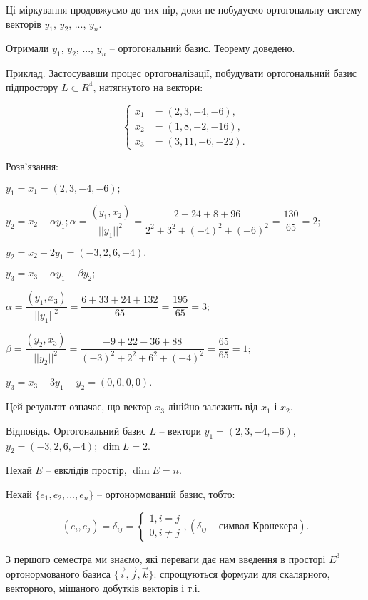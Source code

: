 Ці міркування продовжуємо до тих пір, доки не побудуємо ортогональну
систему векторів $y_1$, $y_2$, ..., $y_n$.

Отримали $y_1$, $y_2$, ..., $y_n$ -- ортогональний базис. Теорему доведено.


Приклад. Застосувавши процес ортогоналізації, побудувати ортогональний
базис підпростору $L \subset R^4$, натягнутого на вектори:

\begin{equation*}
    \left\{\begin{array}{ll} 
        x_1 &= (2, 3, -4, -6),\\
        x_2 &= (1, 8, -2, -16),\\
        x_3 &= (3,11, -6, -22).
    \end{array}\right.
\end{equation*}

Розв’язання:

$y_1 = x_1 = (2, 3, -4, -6);$

$y_2 = x_2 - \alpha y_1; \alpha = \dfrac{(y_1, x_2)}{||y_1||^2}
= \dfrac{2 + 24 + 8 + 96}{2^2 + 3^2 + (-4)^2 + (-6)^2} = \dfrac{130}{65} = 2;$

$y_2 = x_2 - 2 y_1 = (-3, 2, 6, -4).$

$y_3 = x_3 - \alpha y_1 - \beta y_2;$

$\alpha = \dfrac{(y_1, x_3)}{||y_1||^2}
= \dfrac{6 + 33 + 24 + 132}{65} = \dfrac{195}{65} = 3;$

$\beta = \dfrac{(y_2, x_3)}{||y_2||^2}
= \dfrac{-9 + 22 - 36 + 88}{(-3)^2 + 2^2 + 6^2 + (-4)^2} = \dfrac{65}{65} = 1;$

$y_3 = x_3 - 3 y_1 - y_2 = (0, 0, 0, 0)$.

Цей результат означає, що вектор $x_3$ лінійно залежить від $x_1$ і $x_2$.

Відповідь. Ортогональний базис $L$ -- вектори $y_1 = (2, 3, -4, -6)$,
$y_2 = (-3, 2, 6, -4)$; $\dim L = 2$.

Нехай $E$ -- евклідів простір, $\dim E = n$.

Нехай $\{e_1, e_2, ..., e_n\}$ -- ортонормований базис, тобто:

$$(e_i, e_j) = \delta_{ij} = \left\{ \begin{array}{l}
	1, i = j \\
	0, i \neq j
\end{array} \right., (\delta_{ij} \text{ -- символ Кронекера}).$$

З першого семестра ми знаємо, які переваги дає нам введення в просторі $E^3$
ортонормованого базиса $\{\overrightarrow{i}, \overrightarrow{j}, \overrightarrow{k} \}$:
спрощуються формули для скалярного, векторного, мішаного добутків векторів і т.і.

